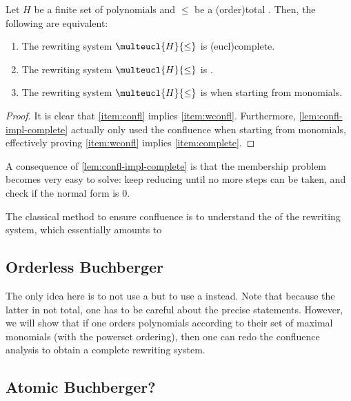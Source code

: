 \begin{lemma}
    \label{lem:confl-iff-corr}
    Let $H$ be a finite set of polynomials and 
    $\leq$ be a 
    \kl(order){total}
    . Then, the following are equivalent:
    \begin{enumerate}
        \item \label{item:complete}
            The rewriting system $\multeucl{H}{\leq}$ is
            \kl(eucl){complete}.
        \item \label{item:confl}
            The rewriting system $\multeucl{H}{\leq}$ is
            .
        \item \label{item:wconfl}
            The rewriting system $\multeucl{H}{\leq}$ is
             when starting from monomials.
    \end{enumerate}
\end{lemma}
\begin{proof}
    It is clear that \cref{item:confl}
    implies \cref{item:wconfl}. Furthermore,
    \cref{lem:confl-impl-complete} actually only used the
    confluence when starting from monomials,
    effectively proving \cref{item:wconfl}
    implies \cref{item:complete}.

\end{proof}

A consequence of \cref{lem:confl-impl-complete} is that the membership problem
becomes very easy to solve: keep reducing until no more steps can be taken, and
check if the normal form is $0$.

The classical method to ensure confluence is to 
understand the  of the rewriting
system, which essentially amounts to

\subsection{Orderless Buchberger}

The only idea here is to not use a  but
to use a  instead. Note that because
the latter in not total, one has to be careful about 
the precise statements. However, we will show that if one
orders polynomials according to their set of maximal monomials
(with the powerset ordering), then one can redo the confluence analysis
to obtain a complete rewriting system.

\subsection{Atomic Buchberger?}
